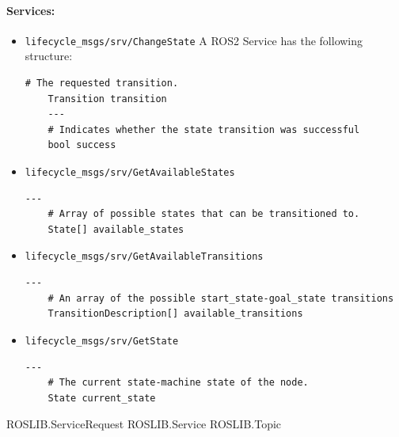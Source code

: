 \paragraph{Services:}

\begin{itemize}
	\item \lstinline{lifecycle_msgs/srv/ChangeState}
A ROS2 Service has the following structure:
\begin{lstlisting}[language=service,
	caption={Service definition ChangeState}]
	# The requested transition.
	Transition transition
	---
	# Indicates whether the state transition was successful
	bool success
\end{lstlisting}



\item \lstinline{lifecycle_msgs/srv/GetAvailableStates}
\begin{lstlisting}[language=service,
	caption={Service definition GetAvailableStates}]
	---
	# Array of possible states that can be transitioned to.
	State[] available_states
\end{lstlisting}

\item \lstinline{lifecycle_msgs/srv/GetAvailableTransitions}
\begin{lstlisting}[language=service,
	caption={Service definition GetAvailableTransitions}]
	---
	# An array of the possible start_state-goal_state transitions
	TransitionDescription[] available_transitions

\end{lstlisting}

\item \lstinline{lifecycle_msgs/srv/GetState}
\begin{lstlisting}[language=service,
	caption={Service definition GetState}]
	---
	# The current state-machine state of the node.
	State current_state
\end{lstlisting}

\end{itemize}



ROSLIB.ServiceRequest
ROSLIB.Service
ROSLIB.Topic


